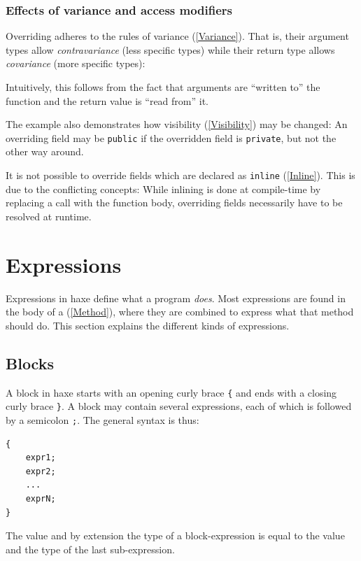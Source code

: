\documentclass{article}
\newcommand{\expr}[1]{\texttt{#1}}
\newcommand{\fullref}[1]{\nameref{#1} (\cref{#1})}
\begin{document}
\subsubsection{Effects of variance and access modifiers}

Overriding adheres to the rules of variance (\ref{Variance}). That is, their argument types allow \emph{contravariance} (less specific types) while their return type allows \emph{covariance} (more specific types):



Intuitively, this follows from the fact that arguments are ``written to'' the function and the return value is ``read from'' it.

The example also demonstrates how visibility (\ref{Visibility}) may be changed: An overriding field may be \expr{public} if the overridden field is \expr{private}, but not the other way around.

It is not possible to override fields which are declared as \expr{inline} (\ref{Inline}). This is due to the conflicting concepts: While inlining is done at compile-time by replacing a call with the function body, overriding fields necessarily have to be resolved at runtime.


\section{Expressions}
\label{Expressions}

Expressions in haxe define what a program \emph{does}. Most expressions are found in the body of a \fullref{Method}, where they are combined to express what that method should do. This section explains the different kinds of expressions.


\subsection{Blocks}

A block in haxe starts with an opening curly brace \expr{\{} and ends with a closing curly brace \expr{\}}. A block may contain several expressions, each of which is followed by a semicolon \expr{;}. The general syntax is thus:

\begin{lstlisting}
{
	expr1;
	expr2;
	...
	exprN;
}
\end{lstlisting}
The value and by extension the type of a block-expression is equal to the value and the type of the last sub-expression.
\end{document}
